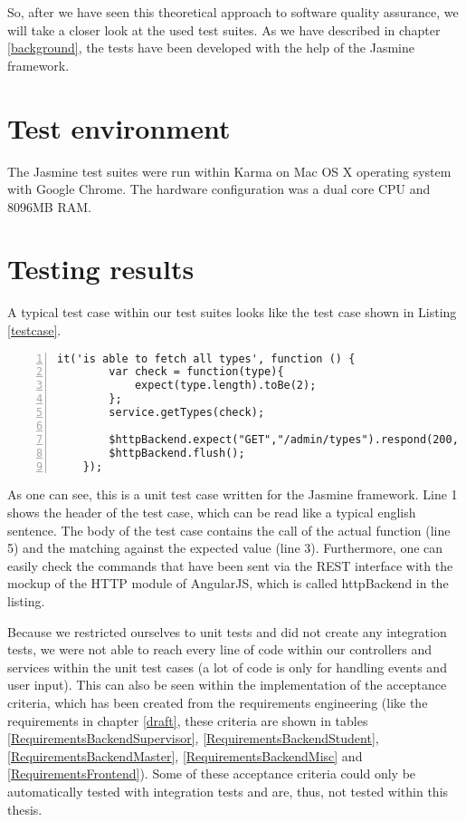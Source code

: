 So, after we have seen this theoretical approach to software quality assurance, we will take a closer look at the used test suites. As we have described in chapter \ref{background}, the tests have been developed with the help of the Jasmine framework.
  
\section{Test environment}
The Jasmine test suites were run within Karma on Mac OS X operating system with Google Chrome. The hardware configuration was a dual core \ac{CPU} and 8096MB \ac{RAM}.

\section{Testing results}
A typical test case within our test suites looks like the test case shown in Listing \ref{testcase}. 

\begin{lstlisting}[numbers=left,caption={Simple test case for the type service},label=testcase,frame=tlbr,breaklines]
    it('is able to fetch all types', function () {
        var check = function(type){
            expect(type.length).toBe(2);
        };
        service.getTypes(check);

        $httpBackend.expect("GET","/admin/types").respond(200, typeList);
        $httpBackend.flush();
    });
\end{lstlisting}

As one can see, this is a unit test case written for the Jasmine framework. Line 1 shows the header of the test case, which can be read like a typical english sentence. The body of the test case contains the call of the actual function (line 5) and the matching against the expected value (line 3). Furthermore, one can easily check the commands that have been sent via the \ac{REST} interface with the mockup of the \ac{HTTP} module of AngularJS, which is called httpBackend in the listing.

Because we restricted ourselves to unit tests and did not create any integration tests, we were not able to reach every line of code within our controllers and services within the unit test cases (a lot of code is only for handling events and user input). This can also be seen within the implementation of the acceptance criteria, which has been created from the requirements engineering (like the requirements in chapter \ref{draft}, these criteria are shown in tables \ref{RequirementsBackendSupervisor}, \ref{RequirementsBackendStudent}, \ref{RequirementsBackendMaster}, \ref{RequirementsBackendMisc} and \ref{RequirementsFrontend}). Some of these acceptance criteria could only be automatically tested with integration tests and are, thus, not tested within this thesis. 

